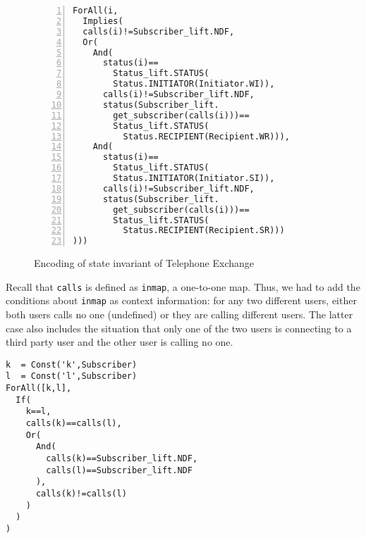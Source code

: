 
\begin{figure}[t]
\begin{center}
\begin{mdframed}[roundcorner=5pt,shadow=true]
\begin{Verbatim}[fontsize=\small,numbers=left]
ForAll(i,
  Implies(
  calls(i)!=Subscriber_lift.NDF,
  Or(
    And(
      status(i)==
        Status_lift.STATUS(
        Status.INITIATOR(Initiator.WI)),
	  calls(i)!=Subscriber_lift.NDF,
      status(Subscriber_lift.
        get_subscriber(calls(i)))==
        Status_lift.STATUS(
          Status.RECIPIENT(Recipient.WR))),
    And(
      status(i)==
        Status_lift.STATUS(
        Status.INITIATOR(Initiator.SI)),
      calls(i)!=Subscriber_lift.NDF,
      status(Subscriber_lift.
        get_subscriber(calls(i)))==
        Status_lift.STATUS(
          Status.RECIPIENT(Recipient.SR)))
)))
\end{Verbatim}
\end{mdframed}
\vspace{-10pt}
\caption{Encoding of state invariant of Telephone Exchange}
\label{fig:encode_state_inv_case2}
\end{center}
\end{figure}

Recall that {\tt calls} is defined as {\tt inmap}, a one-to-one map. Thus, we had to add  the conditions about {\tt inmap} as context information: for any two different users, either both users calls no one (undefined) or they are calling different users. The latter case also includes the situation that only one of the two users is connecting to a third party user and the other user is calling no one.

\begin{mdframed}[roundcorner=5pt,shadow=true]
\begin{Verbatim}[fontsize=\small]
k  = Const('k',Subscriber)
l  = Const('l',Subscriber)
ForAll([k,l],
  If(
    k==l,
    calls(k)==calls(l),
    Or(
      And(
        calls(k)==Subscriber_lift.NDF,
        calls(l)==Subscriber_lift.NDF
      ),
      calls(k)!=calls(l)
    )
  )
)
\end{Verbatim}
\end{mdframed}

